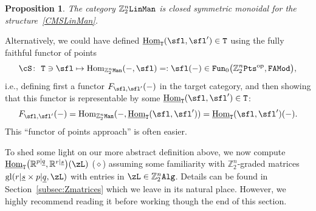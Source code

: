 \documentclass[pdftex]{sigma}%
\newcommand{\op}[1]{\operatorname{#1}}
\newcommand{\R}{{\mathbb R}}
\newcommand{\Z}{{\mathbb Z}}
\def\ul{\underline}
\def\ul{\underline}
\newcommand{\0}{\otimes}
\newcommand{\z}{\Z_2^n}
\numberwithin{equation}{section}
\newtheorem{Proposition}[Theorem]{Proposition}
 { \theoremstyle{definition}
\newtheorem{Definition}[Theorem]{Definition}
\newtheorem{Example}[Theorem]{Example}
\newtheorem{Remark}[Theorem]{Remark} }
\begin{document}
{\sloppy\begin{Proposition}
The category $\z{\tt LinMan}$ is closed symmetric monoidal for the struc\-ture~\eqref{CMSLinMan}.
\end{Proposition}

}

Alternatively, we could have defined $\ul{\op{Hom}}_{\tt T}(\sfl,\sfl')\in\tt T$ using the fully faithful functor of points
\[
\cS\colon\ {\tt T}\ni\sfl\mapsto \op{Hom}_{\z{\tt Man}}(-,\sfl)=:\sfl(-)\in{\tt Fun}_0\big(\z{\tt Pts}^{\op{op}},{\tt FAMod}\big),
\]
i.e., defining first a functor $F_{\sfl,\sfl'}(-)$ in the target category, and then showing that this functor is representable by some $\ul{\op{Hom}}_{\tt T}(\sfl,\sfl')\in\tt T$:
\[
F_{\sfl,\sfl'}(-)=\op{Hom}_{\z\tt Man}(-,\ul{\op{Hom}}_{\tt T}(\sfl,\sfl'))=\ul{\op{Hom}}_{\tt T}(\sfl,\sfl')(-).
\]
This ``functor of points approach'' is often easier.

{\sloppy
To shed some light on our more abstract definition above, we now compute $\ul{\op{Hom}}_{\tt T}\big(\R^{p|\ul q},\R^{r|\ul s}\big)(\zL)$ ($\diamond$) assuming some familiarity with $\z$-graded matrices $\op{gl}(r|\ul s \times p|\ul q,\zL)$ with entries in $\zL\in\z{\tt Alg}$. Details can be found in Section~\ref{subsec:Zmatrices} which we leave in its natural place. However, we highly recommend reading it before working though the end of this section.

}
\end{document}
